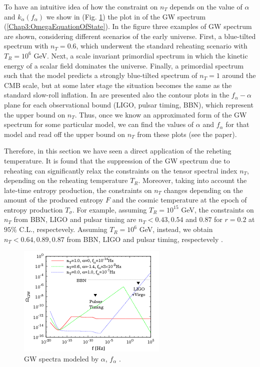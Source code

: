 \documentclass[11pt,a4paper,twoside]{book}
\begin{document}
To have an intuitive idea of how the constraint on $ n_{T} $ depends on the value of $ \alpha $ and $ k_{\alpha} (f_{\alpha}) $ we show in (Fig. \ref{fig:kurojanagitakahashifig7}) the plot  in \cite{Chap3:BlueTiltedSpectrum} of the GW spectrum (\ref{Chap3:OmegaEquationOfState}). In the figure three examples of GW spectrum are shown, considering different scenarios of the early universe. First, a blue-tilted spectrum with $ n_{T} = 0.6 $, which underwent the standard reheating scenario with $ T_{R}=10^{6} $ GeV. Next, a scale invariant primordial spectrum in which the kinetic energy of a scalar field dominates the universe. Finally, a primordial spectrum  such that the model predicts a strongly blue-tilted spectrum of $ n_{T}=1 $ around the CMB scale, but at some later stage the situation becomes the same as the standard slow-roll inflation. 
In \cite{Chap3:BlueTiltedSpectrum} are presented also the contour plots in the $ f_{\alpha}-\alpha $ plane for each observational bound (LIGO, pulsar timing, BBN), which represent the upper bound on $ n_{T} $. Thus, once we know an approximated form  of the GW spectrum for some particular model, we can find the values of $\alpha$ and $ f_{\alpha} $ for that model and read off the upper bound on $ n_{T} $ from these plots (see the paper). 

Therefore, in this section we have seen a direct application of the reheting temperature.  It is found that the suppression of the GW spectrum due to reheating can significantly relax the constraints on the tensor spectral index $ n_{T} $, depending on the reheating temperature $ T_{R} $. Moreover, taking into account the late-time entropy production, the constraints on $ n_{T} $ changes depending on the amount of the produced entropy $ F $ and the cosmic temperature at the epoch of entropy production $ T_{\sigma} $. For example, assuming $ T_{R}=10^{15}  $ GeV, the constraints on $ n_{T} $ from BBN, LIGO and pulsar timing are $ n_{T} < 0.43,0.54 $ and $ 0.87 $ for $ r=0.2 $ at $ 95 \% $ C.L., respectevely. Assuming $ T_{R}=10^{6} $ GeV, instead, we obtain $ n_{T}<0.64,0.89,0.87 $ from BBN, LIGO and pulsar timing, respectevely \cite{Chap3:BlueTiltedSpectrum}.

\begin{figure}[h]
	\centering
	\includegraphics[width=0.7\linewidth, height=0.3\textheight]{Images/Chap3/Kurojanagi_Takahashi_Fig7}
	\caption{GW spectra modeled by $ \alpha $, $ f_{\alpha} $ \cite{Chap3:BlueTiltedSpectrum}.}
	\label{fig:kurojanagitakahashifig7}
\end{figure}
\end{document}
